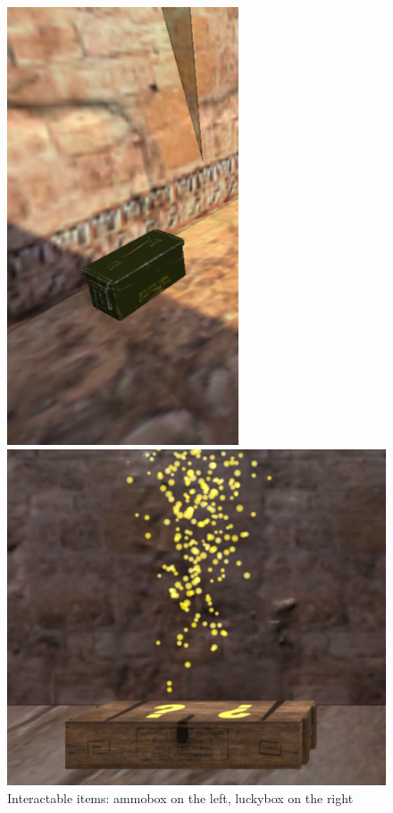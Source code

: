 \documentclass[12pt,a4paper,oneside]{article}
\theoremstyle{definition}
\begin{document}
\begin{figure}
\begin{multicols}{2}
    \includegraphics[height=\linewidth]{figures/Ammobox.png}\par 
    \includegraphics[width=\linewidth]{figures/Luckybox.png}\par 
    \end{multicols}
\caption{Interactable items: ammobox on the left, luckybox on the right}
\end{figure}
\end{document}
